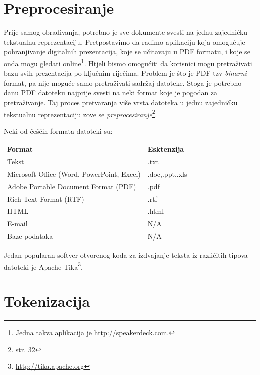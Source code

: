 \documentclass[a4paper,twoside,12pt]{memoir}
\begin{document}
\section{Preprocesiranje}

Prije samog obrađivanja, potrebno je sve dokumente svesti na jednu zajedničku tekstualnu reprezentaciju. Pretpostavimo da radimo aplikaciju koja omogućuje pohranjivanje digitalnih prezentacija, koje se učitavaju u PDF formatu, i koje se onda mogu gledati online\footnote{Jedna takva aplikacija je \url{http://speakerdeck.com}.}. Htjeli bismo omogućiti da korisnici mogu pretraživati bazu svih prezentacija po ključnim riječima. Problem je što je PDF tzv \textit{binarni} format, pa nije moguće samo pretraživati sadržaj datoteke. Stoga je potrebno danu PDF datoteku najprije svesti na neki format koje je pogodan za pretraživanje. Taj proces pretvaranja više vrsta datoteka u jednu zajedničku tekstualnu reprezentaciju zove se \textit{preprocesiranje}\footnote{\cite{taming} str. 32}.

Neki od češćih formata datoteki su:

\begin{center}
  \begin{tabular}{ll}
    \textbf{Format}                            & \textbf{Esktenzija} \\
    Tekst                                      & .txt                \\
    Microsoft Office (Word, PowerPoint, Excel) & .doc,.ppt,.xls      \\
    Adobe Portable Document Format (PDF)       & .pdf                \\
    Rich Text Format (RTF)                     & .rtf                \\
    HTML                                       & .html               \\
    E-mail                                     & N/A                 \\
    Baze podataka                              & N/A                 \\
  \end{tabular}
\end{center}

Jedan popularan softver otvorenog koda za izdvajanje teksta iz različitih tipova datoteki je Apache Tika\footnote{\url{http://tika.apache.org}}.

\section{Tokenizacija}
\end{document}
